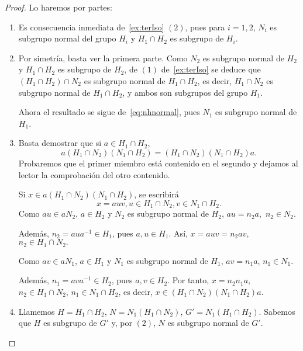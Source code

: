 \documentclass[12pt]{article}
\begin{document}
\begin{proof}
Lo haremos por partes:
\begin{enumerate}
\item Es consecuencia inmediata de~\ref{ex:terIso} $(2)$, pues para $i=1,2$, $N_i$ es subgrupo normal del grupo $H_i$ y $H_1 \cap H_2$ es subgrupo de $H_i$.
\item Por simetría, basta ver la primera parte. Como $N_2$ es subgrupo normal de $H_2$ y $H_1 \cap H_2$ es subgrupo de $H_2$, de $(1)$ de~\ref{ex:terIso} se deduce que $(H_1 \cap H_2) \cap N_2$ es subgrupo normal de $H_1 \cap H_2$, es decir, $H_1 \cap N_2$ es subgrupo normal de $H_1 \cap H_2$, y ambos son subgrupos del grupo $H_1$.

Ahora el resultado se sigue de~\ref{eq:nhnormal}, pues $N_1$ es subgrupo normal de $H_1$.
\item Basta demostrar que si $a \in H_1 \cap H_2$, $$a(H_1 \cap N_2)(N_1 \cap H_2) = (H_1 \cap N_2)(N_1 \cap H_2)a.$$
Probaremos que el primer miembro está contenido en el segundo y dejamos al lector la comprobación del otro contenido. 

Si $x \in a(H_1 \cap N_2)(N_1 \cap H_2)$, se escribirá $$x = auv, u \in H_1 \cap N_2, v \in N_1 \cap H_2.$$ Como $au \in aN_2$, $a \in H_2$ y $N_2$ es subgrupo normal de $H_2$, $au = n_2a,$ $n_2 \in N_2.$ 

Además, $n_2 = aua^{-1} \in H_1$, pues $a, u \in H_1$. Así, $x=auv = n_2av,$ $n_2 \in H_1 \cap N_2.$ 

Como $av \in aN_1$, $a \in H_1$ y $N_1$ es subgrupo normal de $H_1$, $av= n_1a$, $n_1 \in N_1$.

Además, $n_1 = ava^{-1} \in H_2$, pues $a,v \in H_2$. Por tanto, $x = n_2n_1a$, $n_2 \in H_1 \cap N_2$, $n_1 \in N_1 \cap H_2$, es decir, $x \in (H_1 \cap N_2) (N_1 \cap H_2)a.$
\item Llamemos $H = H_1 \cap H_2$, $N = N_1(H_1 \cap N_2)$, $G' = N_1 (H_1 \cap H_2)$. Sabemos que $H$ es subgrupo de $G'$ y, por $(2)$, $N$ es subgrupo normal de $G'$.


\end{enumerate}
\end{proof}
\end{document}
